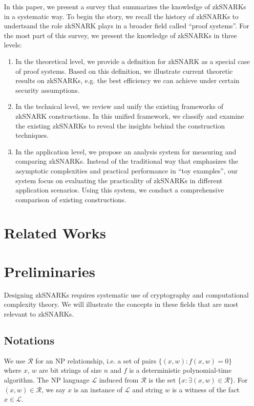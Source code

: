 \documentclass[acmtog]{acmart}
\newcommand{\cL}{\mathcal{L}}
\newcommand{\cR}{\mathcal{R}}
\begin{document}
In this paper, we present a survey that summarizes the knowledge of zkSNARKs in a systematic way.
To begin the story, we recall the history of zkSNARKs to undertsand the role zkSNARK plays in a broader field called ``proof systems''.
For the most part of this survey, we present the knowledge of zkSNARKs in three levels:
\begin{enumerate}
	\item In the theoretical level, we provide a definition for zkSNARK as a special case of proof systems.
	Based on this definition, we illustrate current theoretic results on zkSNARKs, e.g. the best efficiency we can achieve under certain security assumptions.
	\item In the technical level, we review and unify the existing frameworks of zkSNARK constructions.
	In this unified framework, we classify and examine the existing zkSNARKs to reveal the insights behind the construction techniques.
	\item In the application level, we propose an analysis system for measuring and comparing zkSNARKs.
	Instead of the traditional way that emphasizes the asymptotic complexities and practical performance in ``toy examples'', our system focus on evaluating the practicality of zkSNARKs in different application scenarios.
	Using this system, we conduct a comprehensive comparison of existing constructions.
\end{enumerate}

\section{Related Works}



\section{Preliminaries}

Designing zkSNARKs requires systematic use of cryptography and computational complexity theory.
We will illustrate the concepts in these fields that are most relevant to zkSNARKs.

\subsection{Notations}

We use $\cR$ for an NP relationship, i.e. a set of pairs $\{(x,w):f(x,w)=0\}$ where $x$, $w$ are bit strings of size $n$ and $f$ is a deterministic polynomial-time algorithm.
The NP language $\cL$ induced from $\cR$ is the set $\{x:\exists (x,w)\in\cR\}$.
For $(x,w)\in\cR$, we say $x$ is an instance of $\cL$ and string $w$ is a witness of the fact $x\in\cL$.
\end{document}
